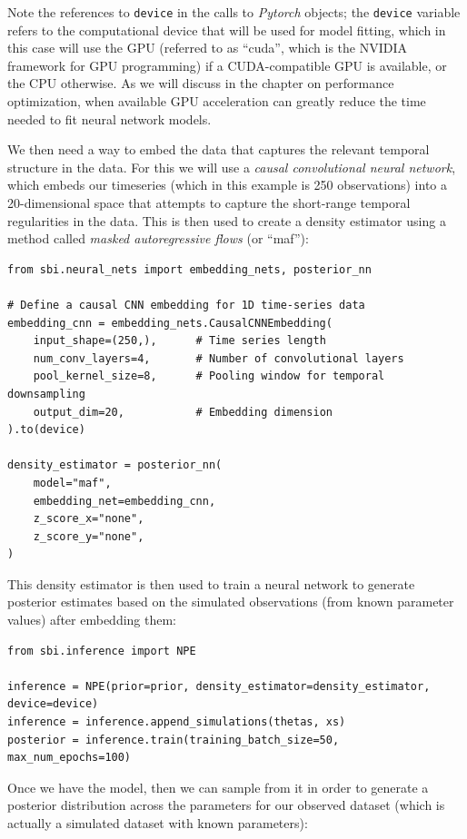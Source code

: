 Note the references to \texttt{device} in the calls to \textit{Pytorch} objects; the \texttt{device} variable refers to the computational device that will be used for model fitting, which in this case will use the GPU (referred to as ``cuda'', which is the NVIDIA framework for GPU programming) if a CUDA-compatible GPU is available, or the CPU otherwise.  As we will discuss in the chapter on performance optimization, when available GPU acceleration can greatly reduce the time needed to fit neural network models.

We then need a way to embed the data that captures the relevant temporal structure in the data.  For this we will use a \textit{causal convolutional neural network},  which embeds our timeseries (which in this example is 250 observations) into a 20-dimensional space that attempts to capture the short-range temporal regularities in the data. This is then used to create a density estimator using a method called \textit{masked autoregressive flows} (or ``maf''):

\begin{lstlisting}[style=Python]
from sbi.neural_nets import embedding_nets, posterior_nn

# Define a causal CNN embedding for 1D time-series data
embedding_cnn = embedding_nets.CausalCNNEmbedding(
    input_shape=(250,),      # Time series length
    num_conv_layers=4,       # Number of convolutional layers
    pool_kernel_size=8,      # Pooling window for temporal downsampling
    output_dim=20,           # Embedding dimension
).to(device)

density_estimator = posterior_nn(
    model="maf",
    embedding_net=embedding_cnn,
    z_score_x="none",
    z_score_y="none",
)
\end{lstlisting}

This density estimator is then used to train a neural network to generate posterior estimates based on the simulated observations (from known parameter values) after embedding them:

\begin{lstlisting}[style=Python]
from sbi.inference import NPE

inference = NPE(prior=prior, density_estimator=density_estimator, device=device)
inference = inference.append_simulations(thetas, xs)
posterior = inference.train(training_batch_size=50, max_num_epochs=100)
\end{lstlisting}

Once we have the model, then we can sample from it in order to generate a posterior distribution across the parameters for our observed dataset (which is actually a simulated dataset with known parameters):

